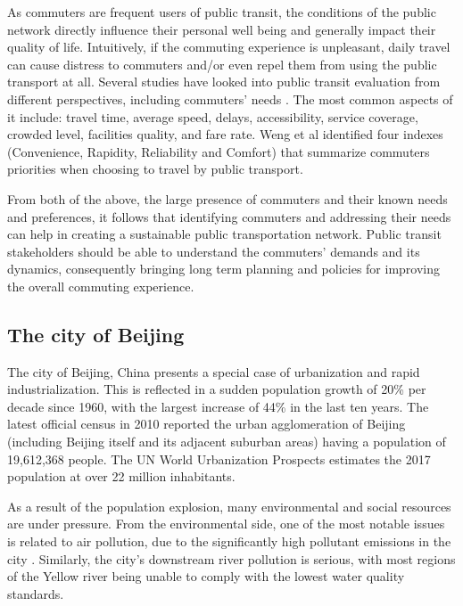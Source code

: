 \documentclass{article}
\begin{document}
As commuters are frequent users of public transit, the  conditions of the public network directly influence their personal well being and generally impact their quality of life. Intuitively, if the commuting experience is unpleasant, daily travel can cause distress to commuters and/or even repel them from using the public transport at all. Several studies have looked into public transit evaluation from different perspectives, including commuters' needs \cite{mao2016commuting}. The most common aspects of it include: travel time, average speed, delays, accessibility, service coverage, crowded level, facilities quality, and fare rate. Weng et al \cite{weng2013bus} identified four indexes (Convenience, Rapidity, Reliability and Comfort) that summarize commuters priorities when choosing to travel by public transport.
 
From both of the above, the large presence of commuters and their known needs and preferences, it follows that identifying commuters and addressing their needs can help in creating a sustainable public transportation network. Public transit stakeholders should be able to understand the commuters' demands and its dynamics, consequently bringing long term planning and policies for improving the overall commuting experience.

\subsection{The city of Beijing}
The city of Beijing, China presents a special case of urbanization and rapid industrialization. This is reflected in a sudden population growth of 20\% per decade since 1960, with the largest increase of 44\% in the last ten years. The latest official census in 2010 reported the urban agglomeration of Beijing (including Beijing itself and its adjacent suburban areas) having a population of 19,612,368 people. The UN World Urbanization Prospects estimates the 2017 population at over 22 million inhabitants. \cite{world2016beijing}

As a result of the population explosion, many environmental and social resources are under pressure. From the environmental side, one of the most notable issues is related to air pollution, due to the significantly high pollutant emissions in the city \cite{zhang2016air}. Similarly, the city's downstream river pollution is serious, with most regions of the Yellow river being unable to comply with the lowest water quality standards. \cite{wang2015studies} 
\end{document}

